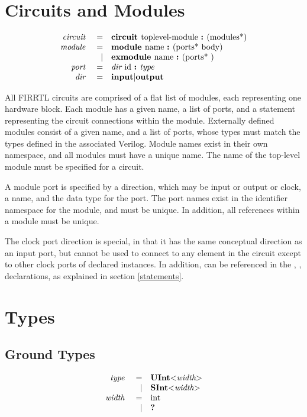\documentclass[10pt]{article}
\begin{document}
\section{Circuits and Modules}
\[
\begin{array}{rrl}
\text{\em circuit\ }    &=     &\text{\bf circuit\ } \text{toplevel-module } \text{\bf :\ } (\text{modules*}) \\
\text{\em module\ }     &=     &\text{\bf module\ }  \text{name } \text{\bf :\ } (\text{ports* } \text{body}) \\
                &\vert &\text{\bf exmodule\ }  \text{name } \text{\bf :\ } (\text{ports* })           \\ 
\text{\em port\ }       &=     &\text{\em dir\ } \text{id } \text{\bf :\ } \text{\em type\ }                                 \\
\text{\em dir\ }        &=     &\text{\bf input} \vert \text{\bf output}                                \\
\end{array}
\]

All FIRRTL circuits are comprised of a flat list of modules, each representing one hardware block.
Each module has a given name, a list of ports, and a statement representing the circuit connections within the module.
Externally defined modules consist of a given name, and a list of ports, whose types must match the types defined in the associated Verilog.
Module names exist in their own namespace, and all modules must have a unique name. The name of the top-level module must be specified for a circuit.

A module port is specified by a direction, which may be input or output or clock, a name, and the data type for the port.
The port names exist in the identifier namespace for the module, and must be unique.
In addition, all references within a module must be unique.

The clock port direction is special, in that it has the same conceptual direction as an input port, but cannot be used to connect to any element in the circuit except to other clock ports of declared instances.
In addition, can be referenced in the , ,  declarations, as explained in section \ref{statements}.

\section{Types}

\subsection{Ground Types}
\[
\begin{array}{rrl}
\text{\em type\ }       &=     &\text{\bf UInt}\text{\bf $<$} \text{\em width} \text{\bf $>$}      \\
                &\vert &\text{\bf SInt}\text{\bf $<$} \text{\em width} \text{\bf $>$}      \\
\text{\em width\ }      &=     &\text{int}                       \\
                &\vert &\text{\bf ?\ }                      \\
\end{array}
\]
\end{document}
